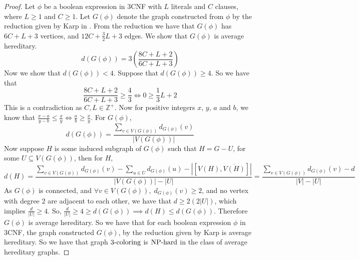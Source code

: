 \documentclass{article}
\newcommand{\classX}[1]{\ensuremath{\text{\textsf{\textbf{#1}}}}}
\newcommand{\NPH}{\classX{NP-hard}}
\newcommand{\Prob}[1]{\ensuremath{\text{\textsc{#1}}}}
\begin{document}
\begin{proof}
    Let $\phi$ be a boolean expression in 3CNF with $L$ literals and $C$ clauses, where $L\geq 1$ and $C\geq 1$.  Let $G(\phi)$ denote the graph constructed from $\phi$ by the reduction given by Karp in \cite{6}. From the reduction we have that $G(\phi)$ has $6C+L+3$ vertices, and $12C+\frac{3}{2}L+3$ edges. We show that $G(\phi)$ is average hereditary.
    $$d(G(\phi)) = 3\left(\frac{8C+L+2}{6C+L+3}\right)$$
    Now we show that $d(G(\phi))< 4$. Suppose that $d(G(\phi))\geq 4$. So we have that $$\frac{8C+L+2}{6C+L+3} \geq \frac{4}{3} \iff 0 \geq \frac{1}{3}L + 2$$
    This is a contradiction as $C, L \in \mathbb{Z}^+$. Now for positive integers $x$, $y$, $a$ and $b$, we know that $\frac{x-a}{y-b} \leq \frac{x}{y} \iff \frac{a}{b} \geq \frac{x}{y}$. For $G(\phi)$, 
    $$d(G(\phi)) = \frac{\sum_{v\in V(G(\phi))}d_{G(\phi)}(v)}{|V(G(\phi))|}$$
    Now suppose $H$ is some induced subgraph of $G(\phi)$ such that $H = G - U$, for some $U \subseteq V(G(\phi))$, then for $H$,
    $$d(H) = \frac{\sum_{v\in V(G(\phi))}d_{G(\phi)}(v) - \sum_{u\in U}d_{G(\phi)}(u)-|[V(H),\overline{V(H)}]|}{|V(G(\phi))| - |U|} = \frac{\sum_{v\in V(G(\phi))}d_{G(\phi)}(v) - d}{|V| - |U|}$$
    As $G(\phi)$ is connected, and $\forall v \in V(G(\phi)),\; d_{G(\phi)}(v) \geq 2$, and no vertex with degree 2 are adjacent to each other, we have that $d  \geq 2(2|U|)$, which implies $\frac{d}{|U|} \geq 4$.
    So, $\frac{d}{|U|} \geq 4 \geq d(G(\phi)) \implies d(H) \leq d(G(\phi))$.
    Therefore $G(\phi)$ is average hereditary. So we have that for each boolean expression $\phi$ in 3CNF, the graph constructed $G(\phi)$, by the reduction given by Karp is average hereditary. So we have that graph \Prob{3-coloring} is $\NPH$ in the class of average hereditary graphs. 
\end{proof}


\end{document}
